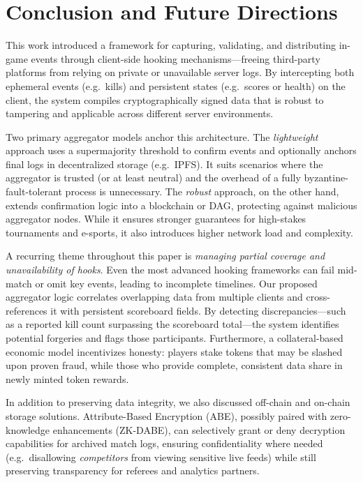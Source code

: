 \documentclass[11pt]{article}
\begin{document}
\section{Conclusion and Future Directions}
\label{sec:conclusion}

This work introduced a framework for capturing, validating, and distributing in-game events through client-side hooking mechanisms—freeing third-party platforms from relying on private or unavailable server logs. By intercepting both ephemeral events (e.g.\ kills) and persistent states (e.g.\ scores or health) on the client, the system compiles cryptographically signed data that is robust to tampering and applicable across different server environments.

Two primary aggregator models anchor this architecture. The \emph{lightweight} approach uses a supermajority threshold to confirm events and optionally anchors final logs in decentralized storage (e.g.\ IPFS). It suits scenarios where the aggregator is trusted (or at least neutral) and the overhead of a fully byzantine-fault-tolerant process is unnecessary. The \emph{robust} approach, on the other hand, extends confirmation logic into a blockchain or DAG, protecting against malicious aggregator nodes. While it ensures stronger guarantees for high-stakes tournaments and e-sports, it also introduces higher network load and complexity.

A recurring theme throughout this paper is \emph{managing partial coverage and unavailability of hooks}. Even the most advanced hooking frameworks can fail mid-match or omit key events, leading to incomplete timelines. Our proposed aggregator logic correlates overlapping data from multiple clients and cross-references it with persistent scoreboard fields. By detecting discrepancies—such as a reported kill count surpassing the scoreboard total—the system identifies potential forgeries and flags those participants. Furthermore, a collateral-based economic model incentivizes honesty: players stake tokens that may be slashed upon proven fraud, while those who provide complete, consistent data share in newly minted token rewards.

In addition to preserving data integrity, we also discussed off-chain and on-chain storage solutions. Attribute-Based Encryption (ABE), possibly paired with zero-knowledge enhancements (ZK-DABE), can selectively grant or deny decryption capabilities for archived match logs, ensuring confidentiality where needed (e.g.\ disallowing \emph{competitors} from viewing sensitive live feeds) while still preserving transparency for referees and analytics partners.
\end{document}
